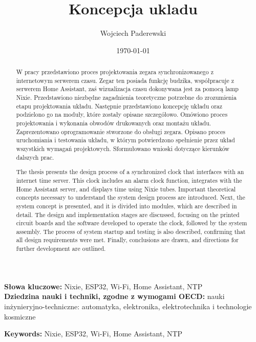 \documentclass[../main.tex]{subfiles}
\author{Wojciech Paderewski}
\date{\today}
\title{Koncepcja ukladu}
\begin{document}
\begin{abstract}
  W pracy przedstawiono proces projektowania zegara synchronizowanego
  z internetowym serwerem czasu. Zegar ten posiada funkcję budzika,
  współpracuje z serwerem Home Assistant, zaś wizualizacja czasu dokonywana
  jest za pomocą lamp Nixie. Przedstawiono niezbędne zagadnienia teoretyczne
  potrzebne do zrozumienia etapu projektowania układu. Następnie
  przedstawiono koncepcję układu oraz podzielono go na moduły, które
  zostały opisane szczegółowo. Omówiono proces projektowania i wykonania
  obwodów drukowanych oraz montażu układu. Zaprezentowano oprogramowanie
  stworzone do obsługi zegara. Opisano proces uruchomiania i testowania układu,
  w którym potwierdzono spełnienie przez układ wszystkich wymagań
  projektowych. Sformułowano wnioski dotyczące kierunków dalszych prac.  
\end{abstract}
\textbf{Słowa kluczowe:} Nixie, ESP32, Wi-Fi, Home Assistant, NTP \\
\textbf{Dziedzina nauki i techniki, zgodne z wymogami OECD:} nauki inżynieryjno-techniczne: automatyka, elektronika, elektrotechnika i technologie kosmiczne
\newpage
{}
\begin{abstract}
  The thesis presents the design process of a synchronized clock that interfaces with an internet time server. This clock includes an alarm clock function, 
  integrates with the Home Assistant server, and displays time using Nixie tubes. Important theoretical concepts necessary to understand the system design process are introduced.
  Next, the system concept is presented, and it is divided into modules, which are described in detail. 
  The design and implementation stages are discussed, focusing on the printed circuit boards and the software developed to operate the clock, followed by the system assembly. 
  The process of system startup and testing is also described, confirming that all design requirements were met.
  Finally, conclusions are drawn, and directions for further development are outlined.
\end{abstract}
\textbf{Keywords:} Nixie, ESP32, Wi-Fi, Home Assistant, NTP
\end{document}
